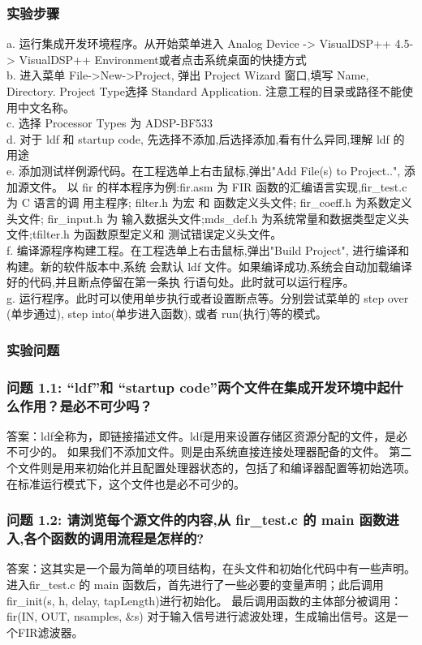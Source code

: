 \documentclass{article}
\begin{document}
\begin{CJK}{UTF8}{gbsn}
\subsubsection{实验步骤} 
a. 运行集成开发环境程序。从开始菜单进入 Analog Device -> VisualDSP++ 4.5-> VisualDSP++ Environment或者点击系统桌面的快捷方式\\
b. 进入菜单 File->New->Project, 弹出 Project Wizard 窗口,填写 Name, Directory. Project Type选择 Standard Application. 注意工程的目录或路径不能使用中文名称。\\
c. 选择 Processor Types 为 ADSP-BF533\\
d. 对于 ldf 和 startup code, 先选择不添加,后选择添加,看有什么异同,理解 ldf 的用途\\
e. 添加测试样例源代码。在工程选单上右击鼠标,弹出"Add File(s) to Project..", 添加源文件。
以 fir 的样本程序为例:fir.asm 为 FIR 函数的汇编语言实现,fir\_test.c 为 C 语言的调
用主程序; filter.h 为宏 和 函数定义头文件; fir\_coeff.h 为系数定义头文件; fir\_input.h 为
输入数据头文件;mds\_def.h 为系统常量和数据类型定义头文件;tfilter.h 为函数原型定义和
测试错误定义头文件。\\
f. 编译源程序构建工程。在工程选单上右击鼠标,弹出"Build Project", 进行编译和构建。新的软件版本中,系统
会默认 ldf 文件。如果编译成功,系统会自动加载编译好的代码,并且断点停留在第一条执
行语句处。此时就可以运行程序。\\
g. 运行程序。此时可以使用单步执行或者设置断点等。分别尝试菜单的 step over (单步通过), step into(单步进入函数), 或者 run(执行)等的模式。
\subsubsection{实验问题}
\subsubsection*{问题 1.1: “ldf”和 “startup code”两个文件在集成开发环境中起什么作用？是必不可少吗？}
答案：ldf全称为，即链接描述文件。ldf是用来设置存储区资源分配的文件，是必不可少的。
如果我们不添加文件。则是由系统直接连接处理器配备的文件。
第二个文件则是用来初始化并且配置处理器状态的，包括了和编译器配置等初始选项。
在标准运行模式下，这个文件也是必不可少的。
\subsubsection*{问题 1.2: 请浏览每个源文件的内容,从 fir\_test.c 的 main 函数进入,各个函数的调用流程是怎样的?}
答案：这其实是一个最为简单的项目结构，在头文件和初始化代码中有一些声明。
进入fir\_test.c 的 main 函数后，首先进行了一些必要的变量声明；此后调用fir\_init(s, h, delay, tapLength)进行初始化。
最后调用函数的主体部分被调用：fir(IN, OUT, nsamples, \&s) 
对于输入信号进行滤波处理，生成输出信号。这是一个FIR滤波器。

\end{CJK}
\end{document}
